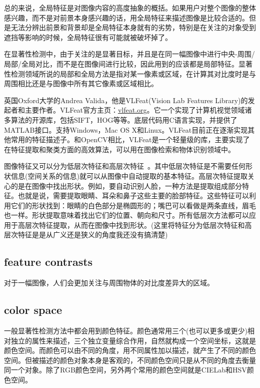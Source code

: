 \documentclass[12pt]{article}
\begin{document}
总的来说，全局特征是对图像内容的高度抽象的概括。如果用户对整个图像的整体感兴趣，而不是对前景本身感兴趣的话，用全局特征来描述图像是比较合适的。但是无法分辨出前景和背景却是全局特征本身就有的劣势，特别是在关注的对象受到遮挡等影响的时候，全局特征很有可能就被破坏掉了。

在显著性检测中，由于关注的是显著目标，并且是在同一幅图像中进行中央-周围/局部/全局对比，而不是在图像间进行比较，因此用到的应该都是局部特征。显著性检测领域所说的局部和全局方法是指对某一像素或区域，在计算其对比度时是与周围相比还是与图像中所有其它像素或区域相比。

英国Oxford大学的Andrea Valida，他是VLFeat(Vision Lab Features Library)的发起者和主要作者。VLFeat官方主页：\url{vlfeat.org}。它一个实现了计算机视觉领域诸多算法的开源库，包括SIFT，HOG等等。底层代码用C语言实现，并提供了MATLAB接口。支持Windows，Mac OS X和Linux。VLFeat目前正在逐渐实现其他常用的特征描述子。和OpenCV相比，VLFeat是一个轻量级的库，主要实现了在特征提取和聚类方面的高效算法，可以用在图像检索和物体识别领域中。

图像特征又可以分为低层次特征和高层次特征~\cite{nixon2012feature}。其中低层次特征是不需要任何形状信息(空间关系的信息)就可以从图像中自动提取的基本特征。高层次特征提取关心的是在图像中找出形状。例如，要自动识别人脸，一种方法是提取组成部分特征。也就是说，需要提取眼睛、耳朵和鼻子这些主要的脸部特征。这些特征可以利用它们的形状找到：眼睛的白色部分是椭圆形的；嘴巴可以看做是两条直线，眉毛也一样。形状提取意味着找出它们的位置、朝向和尺寸。所有低层次方法都可以应用于高层次特征提取，从而在图像中找到形状。(这里将特征分为低层次特征和高层次特征是是从广义还是狭义的角度我还没有搞清楚)

\subsection{feature contrasts}

对于一幅图像，人们会更加关注与周围物体的对比度差异大的区域。

\subsection{color space}

一般显著性检测方法中都会用到颜色特征。颜色通常用三个(也可以更多或更少)相对独立的属性来描述，三个独立变量综合作用，自然就构成一个空间坐标，这就是颜色空间。而颜色可以由不同的角度，用不同属性加以描述，就产生了不同的颜色空间。但被描述的颜色对象本身是客观的，不同颜色空间只是从不同的角度去衡量同一个对象。除了RGB颜色空间，另外两个常用的颜色空间就是CIELab和HSV颜色空间。
\end{document}
